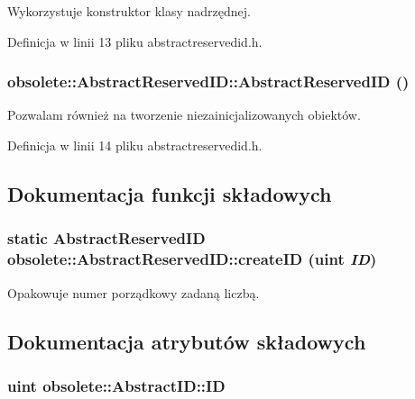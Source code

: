 Wykorzystuje konstruktor klasy nadrzędnej. 



Definicja w linii 13 pliku abstractreservedid.h.

\hypertarget{classobsolete_1_1AbstractReservedID_ae01ec9522e9f8e7bbf28defe15266c2e}{
\subsubsection[{AbstractReservedID}]{\setlength{\rightskip}{0pt plus 5cm}obsolete::AbstractReservedID::AbstractReservedID ()}}
\label{classobsolete_1_1AbstractReservedID_ae01ec9522e9f8e7bbf28defe15266c2e}


Pozwalam również na tworzenie niezainicjalizowanych obiektów. 



Definicja w linii 14 pliku abstractreservedid.h.



\subsection{Dokumentacja funkcji składowych}
\hypertarget{classobsolete_1_1AbstractReservedID_a38fa00bf6097ab9cff285c8480c8097e}{
\subsubsection[{createID}]{\setlength{\rightskip}{0pt plus 5cm}static {\bf AbstractReservedID} obsolete::AbstractReservedID::createID (uint {\em ID})}}
\label{classobsolete_1_1AbstractReservedID_a38fa00bf6097ab9cff285c8480c8097e}


Opakowuje numer porządkowy zadaną liczbą. 



\subsection{Dokumentacja atrybutów składowych}
\hypertarget{classobsolete_1_1AbstractID_a5f67fa1c7d96085f0ef41193b60b570c}{
\subsubsection[{ID}]{\setlength{\rightskip}{0pt plus 5cm}uint {\bf obsolete::AbstractID::ID}}}
\label{classobsolete_1_1AbstractID_a5f67fa1c7d96085f0ef41193b60b570c}


